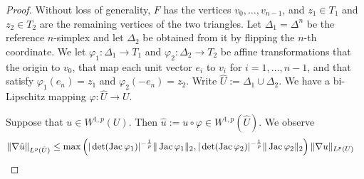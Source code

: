\documentclass[10pt,a4paper]{article}
\begin{document}
\begin{proof}
    Without loss of generality, $F$ has the vertices $v_0, \dots, v_{n-1}$,
    and $z_{1} \in T_{1}$ and $z_{2} \in T_{2}$ are the remaining vertices of the two triangles. 
    Let $\Delta_{1} = \Delta^{n}$ be the reference $n$-simplex and let $\Delta_{2}$ be obtained from it by flipping the $n$-th coordinate.
    We let $\varphi_{1} : \Delta_{1} \rightarrow T_{1}$ and $\varphi_{2} : \Delta_{2} \rightarrow T_{2}$
    be affine transformations that the origin to $v_0$, that map each unit vector $e_{i}$ to $v_{i}$ for $i = 1, \dots, n-1$,
    and that satisfy $\varphi_{1}(e_{n}) = z_{1}$ and $\varphi_{2}(-e_{n}) = z_{2}$.
    Write $\hat U := \Delta_1 \cup \Delta_2$.
    We have a bi-Lipschitz mapping $\varphi : \hat U \rightarrow U$. 
    
    Suppose that $u \in W^{1,p}(U)$. Then $\hat u := u \circ \varphi \in W^{1,p}(\hat U)$. 
    We observe 
    \begin{align*}
        \| \nabla \hat u \|_{L^{p}(\hat U)}
        &\leq 
        \max\left( 
            |\det(\Jacobian \varphi_1)|^{-\frac 1 p} \matnorm{ \Jacobian \varphi_1 }
            ,
            |\det(\Jacobian \varphi_2)|^{-\frac 1 p} \matnorm{ \Jacobian \varphi_2 }
        \right)
        \| \nabla u \|_{L^{p}(U)}

\end{align*}
\end{proof}
\end{document}
